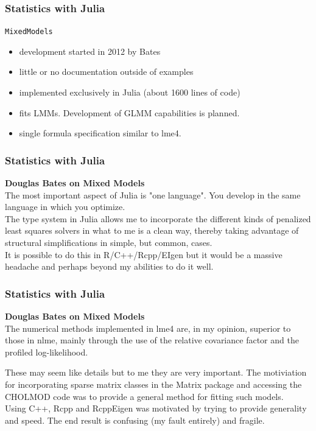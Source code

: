 \documentclass[Master.tex]{subfiles}
\begin{document}
\begin{frame}
	\frametitle{Statistics with Julia}
	\large
\texttt{MixedModels}
\begin{itemize}
\item development started in 2012 by Bates
\item little or no documentation outside of examples
\item implemented exclusively in Julia (about 1600 lines of code)
\item  fits LMMs.  Development of GLMM capabilities is planned.
\item single formula specification similar to lme4. 
\end{itemize}
\end{frame}
\begin{frame}
	\frametitle{Statistics with Julia}
\large
\noindent \textbf{Douglas Bates on Mixed Models}\\ \medskip
	The most important aspect of Julia is "one
		language".  You develop in the same language in which you optimize.  \\
		\medskip
		The type system in Julia allows me to incorporate the different kinds of penalized least squares solvers in what to me is a clean way, thereby taking advantage of structural simplifications in simple, but common, cases. \\
		
		\medskip
		It is possible to do this in R/C++/Rcpp/EIgen but it would be a massive headache and perhaps beyond my abilities to do it well.

\end{frame}
\begin{frame}
	\frametitle{Statistics with Julia}
	\large
\noindent \textbf{Douglas Bates on Mixed Models}\\ \medskip
The numerical methods implemented in lme4 are, in my opinion,
superior to those in nlme, mainly through the use of the relative
covariance factor and the profiled log-likelihood.  \\ \medskip

These may seem like details but to me they are very important.  The motiviation for
incorporating sparse matrix classes in the Matrix package and accessing the CHOLMOD code was to provide a general method for fitting such models.
\\ \medskip
Using C++, Rcpp and RcppEigen was motivated by trying to provide generality
and speed. The end result is confusing (my fault entirely) and fragile.

\end{frame}
\end{document}
